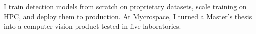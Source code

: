 

\begin{cvparagraph}
I train detection models from scratch on proprietary datasets, scale training on HPC, and deploy them to production. At Mycrospace, I turned a Master's thesis into a computer vision product tested in five laboratories.
\end{cvparagraph}
